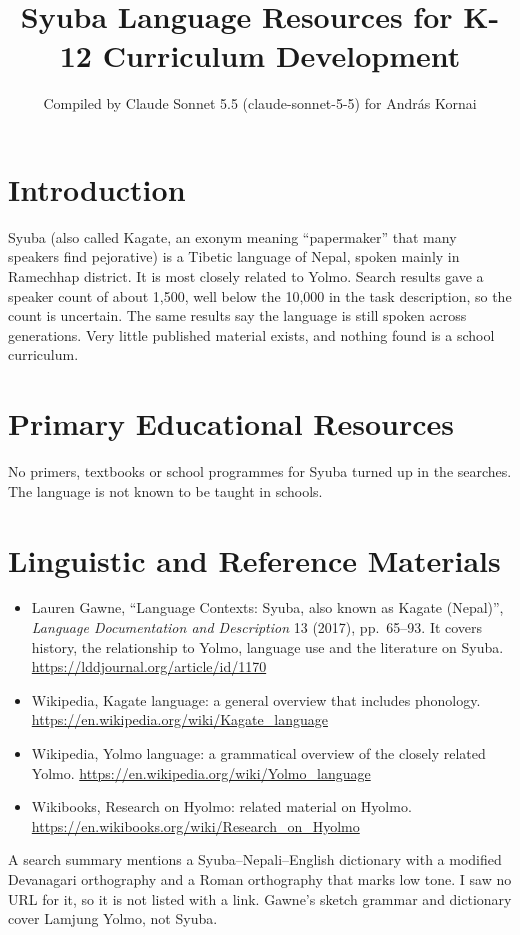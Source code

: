 \documentclass[12pt]{article}
\title{Syuba Language Resources for K-12 Curriculum Development}
\author{Compiled by Claude Sonnet 5.5 (claude-sonnet-5-5) for Andr\'as Kornai}
\date{}
\begin{document}
\maketitle

\section{Introduction}
Syuba (also called Kagate, an exonym meaning ``papermaker'' that many speakers find pejorative) is a Tibetic language of Nepal, spoken mainly in Ramechhap district. It is most closely related to Yolmo. Search results gave a speaker count of about 1,500, well below the 10,000 in the task description, so the count is uncertain. The same results say the language is still spoken across generations. Very little published material exists, and nothing found is a school curriculum.

\section{Primary Educational Resources}
No primers, textbooks or school programmes for Syuba turned up in the searches. The language is not known to be taught in schools.

\section{Linguistic and Reference Materials}
\begin{itemize}
\item Lauren Gawne, ``Language Contexts: Syuba, also known as Kagate (Nepal)'', \emph{Language Documentation and Description} 13 (2017), pp.\ 65--93. It covers history, the relationship to Yolmo, language use and the literature on Syuba. \url{https://lddjournal.org/article/id/1170}
\item Wikipedia, Kagate language: a general overview that includes phonology. \url{https://en.wikipedia.org/wiki/Kagate_language}
\item Wikipedia, Yolmo language: a grammatical overview of the closely related Yolmo. \url{https://en.wikipedia.org/wiki/Yolmo_language}
\item Wikibooks, Research on Hyolmo: related material on Hyolmo. \url{https://en.wikibooks.org/wiki/Research_on_Hyolmo}
\end{itemize}
A search summary mentions a Syuba--Nepali--English dictionary with a modified Devanagari orthography and a Roman orthography that marks low tone. I saw no URL for it, so it is not listed with a link. Gawne's sketch grammar and dictionary cover Lamjung Yolmo, not Syuba.
\end{document}
